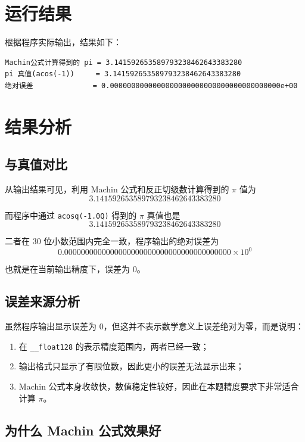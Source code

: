 \documentclass[12pt,a4paper]{article}
\begin{document}
\section{运行结果}

根据程序实际输出，结果如下：

\begin{lstlisting}
Machin公式计算得到的 pi = 3.141592653589793238462643383280
pi 真值(acos(-1))     = 3.141592653589793238462643383280
绝对误差              = 0.0000000000000000000000000000000000000000e+00
\end{lstlisting}

\section{结果分析}

\subsection{与真值对比}

从输出结果可见，利用 Machin 公式和反正切级数计算得到的 $\pi$ 值为
\[
3.141592653589793238462643383280
\]

而程序中通过 \texttt{acosq(-1.0Q)} 得到的 $\pi$ 真值也是
\[
3.141592653589793238462643383280
\]

二者在 30 位小数范围内完全一致，程序输出的绝对误差为
\[
0.0000000000000000000000000000000000000000\times 10^0
\]

也就是在当前输出精度下，误差为 0。

\subsection{误差来源分析}

虽然程序输出显示误差为 0，但这并不表示数学意义上误差绝对为零，而是说明：
\begin{enumerate}[label=\arabic*)]
    \item 在 \texttt{\_\_float128} 的表示精度范围内，两者已经一致；
    \item 输出格式只显示了有限位数，因此更小的误差无法显示出来；
    \item Machin 公式本身收敛快，数值稳定性较好，因此在本题精度要求下非常适合计算 $\pi$。
\end{enumerate}

\subsection{为什么 Machin 公式效果好}
\end{document}
